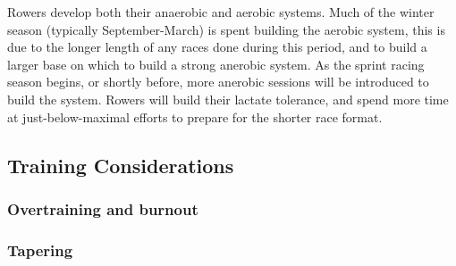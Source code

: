 Rowers develop both their anaerobic and aerobic systems. Much of the winter season (typically September-March) is spent building the aerobic system, this is due to the longer length of any races done during this period, and to build a larger base on which to build a strong anerobic system. As the sprint racing season begins, or shortly before, more anerobic sessions will be introduced to build the system. Rowers will build their lactate tolerance, and spend more time at just-below-maximal efforts to prepare for the shorter race format.


\subsection{Training Considerations}
\subsubsection{Overtraining and burnout}

\subsubsection{Tapering}


